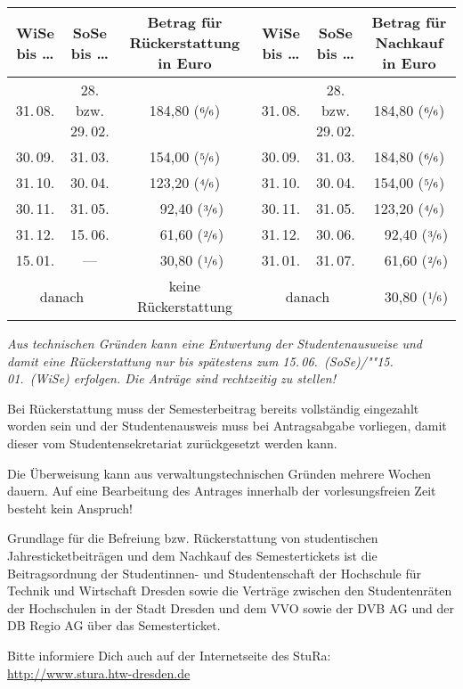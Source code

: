 \documentclass[%
	ngerman,	%
	parskip=half,
	paper=a4,%
	pagesize=auto	%
	]{scrartcl}
\begin{document}
\begin{center}
\begin{tabular}{cccccc}
	\toprule
		WiSe bis \dots
		& SoSe bis \dots
		& Betrag für Rückerstattung in Euro
		& WiSe bis \dots
		& SoSe bis \dots
		& Betrag für Nachkauf in Euro
		\tabularnewline
	\midrule
			31.\,08.
			& 28. bzw. 29.\,02.
			& 184,80 ($\nicefrac{6}{6}$)
			& 31.\,08.
			& 28. bzw. 29.\,02.
			& 184,80 ($\nicefrac{6}{6}$)
			\tabularnewline
			30.\,09.
			& 31.\,03.
			& 154,00 ($\nicefrac{5}{6}$)
			& 30.\,09.
			& 31.\,03.
			& 184,80 ($\nicefrac{6}{6}$)
			\tabularnewline
			31.\,10.
			& 30.\,04.
			& 123,20 ($\nicefrac{4}{6}$)
			& 31.\,10.
			& 30.\,04.
			& 154,00 ($\nicefrac{5}{6}$)
			\tabularnewline
			30.\,11.
			& 31.\,05.
			& ~~92,40 ($\nicefrac{3}{6}$)
			& 30.\,11.
			& 31.\,05.
			& 123,20 ($\nicefrac{4}{6}$)
			\tabularnewline
			31.\,12.
			& 15.\,06.
			& ~~61,60 ($\nicefrac{2}{6}$)
			& 31.\,12.
			& 30.\,06.
			& ~~92,40 ($\nicefrac{3}{6}$)
			\tabularnewline
			15.\,01.
			& --- 
			& ~~30,80 ($\nicefrac{1}{6}$)
			& 31.\,01.		
			& 31.\,07.
			& ~~61,60 ($\nicefrac{2}{6}$)
			\tabularnewline
			\multicolumn{2}{c}{danach}
			& keine Rückerstattung
			&	\multicolumn{2}{c}{danach}
			& ~~30,80 ($\nicefrac{1}{6}$)
			\tabularnewline
	\bottomrule
\end{tabular}
\end{center}

\emph{Aus technischen Gründen kann eine Entwertung der Studentenausweise
und damit eine Rückerstattung nur bis spätestens zum
15.\,06.~(SoSe)/""15.\,01.~(WiSe) erfolgen. Die Anträge sind rechtzeitig zu stellen!}

Bei Rückerstattung muss der Semesterbeitrag bereits vollständig eingezahlt
worden sein und der Studentenausweis muss bei Antragsabgabe
vorliegen, damit dieser vom Studentensekretariat zurückgesetzt werden kann.

Die Überweisung kann aus verwaltungstechnischen Gründen mehrere Wochen
dauern. Auf eine Bearbeitung des Antrages innerhalb der vorlesungsfreien
Zeit besteht kein Anspruch!

Grundlage für die Befreiung bzw. Rückerstattung von studentischen
Jahresticketbeiträgen und dem Nachkauf des Semestertickets ist die
Beitragsordnung der Studentinnen- und Studentenschaft der Hochschule für Technik
und Wirtschaft Dresden sowie die Verträge zwischen den Studentenräten der
Hochschulen in der Stadt Dresden und dem VVO sowie der DVB AG und der DB Regio
AG über das Semesterticket.

Bitte informiere Dich auch auf der Internetseite des StuRa:
\url{http://www.stura.htw-dresden.de}
\end{document}
